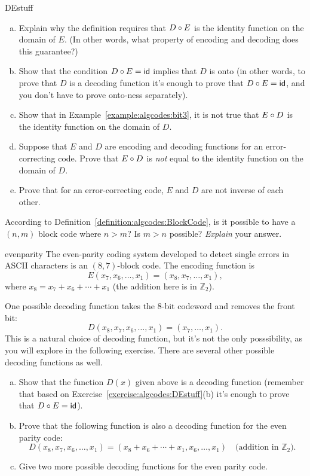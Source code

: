 \begin{exercise}{DEstuff}
\begin{enumerate}[(a)]
\item
Explain why the definition requires that $D \circ E$ is the identity function on the domain of $E$. (In other words, what property of encoding and decoding does this guarantee?)
\item
Show that the condition $D \circ E = \sf{id}$ implies that $D$ is onto  (in other words, to prove that $D$ is a decoding function it's enough to prove that $D \circ E = \sf{id}$, and you don't have to prove onto-ness separately).
\item
Show that in Example~\ref{example:algcodes:bit3}, it is not true that $E \circ D$ is the identity function on the domain of $D$.
\item
Suppose that  $E$ and $D$ are  encoding and decoding functions for an error-correcting code. Prove that $E \circ D$ is \emph{not} equal to the identity function on the domain of $D$.
\item
Prove that for an error-correcting code, $E$ and $D$ are not inverse of each other. 
\end{enumerate}
\end{exercise}

\begin{exercise}{}
According to Definition~\ref{definition:algcodes:BlockCode}, is it possible to have a $(n,m)$ block code where $n > m$? Is $m > n$ possible? \emph{Explain} your answer.
\end{exercise}
 
\begin{example}{evenparity}
The even-parity coding system developed to detect single errors in
ASCII characters is an $(8,7)$-block code. The encoding function is
\[
E(x_7, x_6, \ldots, x_1) = (x_8, x_7,  \ldots, x_1),
\]
where $x_8 = x_7 + x_6 + \cdots + x_1$ (the addition here is in $\mathbb{Z}_2$). 

One possible decoding function takes the 8-bit codeword and removes the front bit:
\[
D(x_8,x_7, x_6, \ldots, x_1) = (x_7,  \ldots, x_1).
\]
This is a natural choice of decoding function, but it's not the only posssibility, as you will explore in the following exercise.
There are several other possible decoding functions as well.  
\end{example}
\begin{exercise}{}
\begin{enumerate}[(a)]
\item
Show that the function $D(x)$ given above is a decoding function (remember that based on Exercise~\ref{exercise:algcodes:DEstuff}(b) it's enough to prove that $D \circ E = \sf{id}$). 
\item
Prove that the following function is also a decoding function for the even parity code:
\[
D(x_8,x_7, x_6, \ldots, x_1) = ( x_8 + x_6 + \cdots + x_1, x_6,  \ldots, x_1)\quad \textrm{(addition in }\mathbb{Z}_2).
\]
\item
Give two more possible decoding functions for the even parity code.
\end{enumerate}
\end{exercise}

